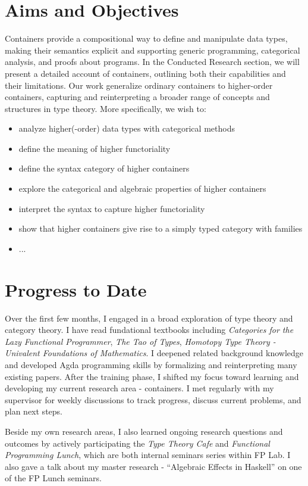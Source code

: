 \section{Aims and Objectives}

Containers provide a compositional way to define and manipulate data types, making their semantics explicit and supporting generic programming, categorical analysis, and proofs about programs. In the Conducted Research section, we will present a detailed account of containers, outlining both their capabilities and their limitations. Our work generalize ordinary containers to higher-order containers, capturing and reinterpreting a broader range of concepts and structures in type theory. More specifically, we wish to:

\begin{itemize}
  \item{analyze higher(-order) data types with categorical methods}
  \item{define the meaning of higher functoriality}
  \item{define the syntax category of higher containers}
  \item{explore the categorical and algebraic properties of higher containers}
  \item{interpret the syntax to capture higher functoriality}
  \item{show that higher containers give rise to a simply typed category with families}
  \item{...}
\end{itemize}

\section{Progress to Date}

Over the first few months, I engaged in a broad exploration of type theory and category theory. I have read fundational textbooks including \textit{Categories for the Lazy Functional Programmer}, \textit{The Tao of Types}, \textit{Homotopy Type Theory - Univalent Foundations of Mathematics}. I deepened related background knowledge and developed Agda programming skills by formalizing and reinterpreting many existing papers. After the training phase, I shifted my focus toward learning and developing my current research area - containers. I met regularly with my supervisor for weekly discussions to track progress, discuss current problems, and plan next steps.

Beside my own research areas, I also learned ongoing research questions and outcomes by actively participating the \textit{Type Theory Cafe} and \textit{Functional Programming Lunch}, which are both internal seminars series within FP Lab. I also gave a talk about my master research - ``Algebraic Effects in Haskell'' on one of the FP Lunch seminars.

